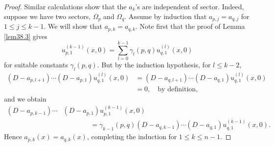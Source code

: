 \documentclass{surv-l}
\theoremstyle{plain}
\theoremstyle{definition}
\numberwithin{equation}{chapter}
\begin{document}
\begin{proof}
Similar calculations show that the $a_{k}$'s are independent of sector. Indeed, suppose we have two sectors, $\Omega_{p}$ and $\Omega_{q}$. Assume by induction that $a_{p,j}=a_{q,j}$ for $1\leq j\leq k-1$. We will show that $a_{p,k}=a_{q,k}$. Note first that the proof of Lemma \ref{lem38.3} gives
\begin{equation*}
u_{p,1}^{(k-1)}(x, 0)=\sum_{l=0}^{k-1}\gamma_{l}(p, q)u_{q,1}^{(l)}(x, 0)
\end{equation*}
for suitable constants $\gamma_{l}(p, q)$. But by the induction hypothesis, for $l\leq k-2,$
\begin{align*}
(D-a_{p,l+1})\cdots(D-a_{p,1})u_{q,1}^{(l)}(x, 0)&= (D-a_{q,l+1})\cdots(D-a_{q,1})u_{q,1}^{(l)}(x, 0)\\
&=0,\quad \text{by definition},
\end{align*}
and we obtain
\begin{align*}
(D-a_{p,k-1})\cdots&(D-a_{p,1})u_{p,1}^{(k-1)}(x,0)\\
&\qquad \qquad=\gamma_{k-1}(p, q)(D-a_{q,k-1})\cdots(D-a_{q,1})u_{q,1}^{(k-1)}(x, 0).
\end{align*}
Hence $a_{p,k}(x)=a_{q,k}(x)$, completing the induction for $1\leq k\leq n-1$.


\end{proof}
\end{document}
